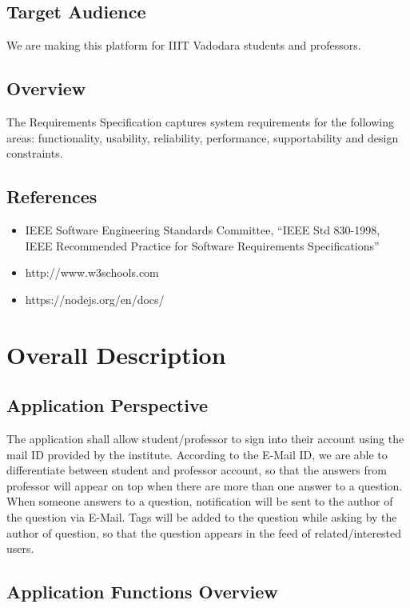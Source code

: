 \documentclass[journal,12pt,onecolumn,draftclsnofoot,]{IEEEtran}
\begin{document}
\subsection{Target Audience}
We are making this platform for IIIT Vadodara students and professors. 

\subsection{Overview}

The Requirements Specification captures system requirements for the following areas: functionality,
usability, reliability, performance, supportability and design constraints.

\subsection{References}
\begin{itemize}
\item IEEE Software Engineering Standards Committee, “IEEE Std 830-1998, IEEE Recommended Practice for Software Requirements Specifications”
\item http://www.w3schools.com
\item https://nodejs.org/en/docs/
\end{itemize}

\section{Overall Description}

\subsection{Application Perspective}
The application shall allow student/professor to sign into their account using the mail ID provided by the institute. According to the E-Mail ID, we are able to differentiate between student and professor account, so that the answers from professor will appear on top when there are more than one answer to a question. When someone answers to a question, notification will be sent to the author of the question via E-Mail. Tags will be added to the question while asking by the author of question, so that the question appears in the feed of related/interested users. 

\subsection{Application Functions Overview}
\end{document}
